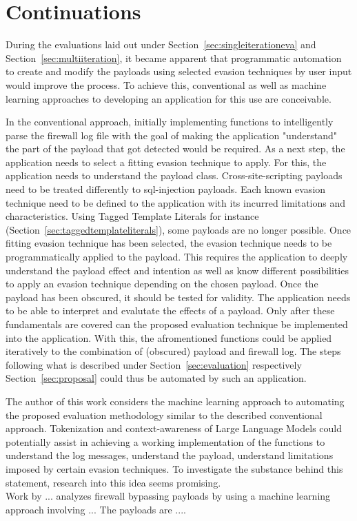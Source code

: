 \section{Continuations}
\label{sec:continuations}
During the evaluations laid out under Section~\ref{sec:singleiterationeva} and Section~\ref{sec:multiiteration}, it became apparent that programmatic automation to create and modify the payloads using selected evasion techniques by user input would improve the process. To achieve this, conventional as well as machine learning approaches to developing an application for this use are conceivable.

In the conventional approach, initially implementing functions to intelligently parse the firewall log file with the goal of making the application "understand" the part of the payload that got detected would be required. As a next step, the application needs to select a fitting evasion technique to apply. For this, the application needs to understand the payload class. Cross-site-scripting payloads need to be treated differently to sql-injection payloads. Each known evasion technique need to be defined to the application with its incurred limitations and characteristics. Using Tagged Template Literals for instance (Section~\ref{sec:taggedtemplateliterals}), some payloads are no longer possible.
Once fitting evasion technique has been selected, the evasion technique needs to be programmatically applied to the payload. This requires the application to deeply understand the payload effect and intention as well as know different possibilities to apply an evasion technique depending on the chosen payload. Once the payload has been obscured, it should be tested for validity. The application needs to be able to interpret and evalutate the effects of a payload. Only after these fundamentals are covered can the proposed evaluation technique be implemented into the application. With this, the afromentioned functions could be applied iteratively to the combination of (obscured) payload and firewall log. The steps following what is described under Section~\ref{sec:evaluation} respectively Section~\ref{sec:proposal} could thus be automated by such an application. 

The author of this work considers the machine learning approach to automating the proposed evaluation methodology similar to the described conventional approach. Tokenization and context-awareness of Large Language Models could potentially assist in achieving a working implementation of the functions to understand the log messages, understand the payload, understand limitations imposed by certain evasion techniques. To investigate the substance behind this statement, research into this idea seems promising. \\ 
Work by ...  analyzes firewall bypassing payloads by using a machine learning approach involving ... The payloads are ....
